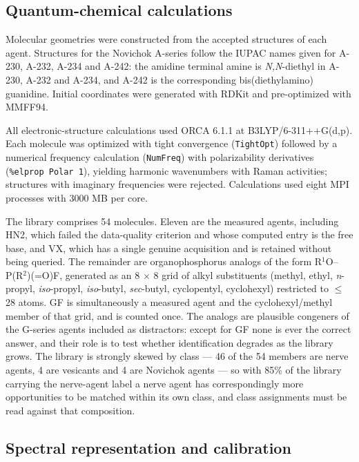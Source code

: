 \documentclass[review,12pt]{elsarticle}
\begin{document}
\subsection{Quantum-chemical calculations}

Molecular geometries were constructed from the accepted structures of each agent. Structures for the Novichok A-series follow the IUPAC names given for A-230, A-232, A-234 and A-242\cite{mirzayanov2008state,kloske2019novichoks,bhakhoa2019theoretical}: the amidine terminal amine is \textit{N,N}-diethyl in A-230, A-232 and A-234, and A-242 is the corresponding bis(diethylamino) guanidine. Initial coordinates were generated with RDKit\cite{rdkit} and pre-optimized with MMFF94.

All electronic-structure calculations used ORCA 6.1.1\cite{neese2020orca,neese2022software} at B3LYP/6-311++G(d,p).\cite{becke1993density,lee1988development,stephens1994abinitio} Each molecule was optimized with tight convergence (\texttt{TightOpt}) followed by a numerical frequency calculation (\texttt{NumFreq}) with polarizability derivatives (\texttt{\%elprop Polar 1}), yielding harmonic wavenumbers with Raman activities; structures with imaginary frequencies were rejected. Calculations used eight MPI processes with 3000 MB per core.

The library comprises 54 molecules. Eleven are the measured agents, including HN2, which failed the data-quality criterion and whose computed entry is the free base, and VX, which has a single genuine acquisition and is retained without being queried. The remainder are organophosphorus analogs of the form R$^{1}$O--P(R$^{2}$)(=O)F, generated as an 8 $\times$ 8 grid of alkyl substituents (methyl, ethyl, \textit{n}-propyl, \textit{iso}-propyl, \textit{iso}-butyl, \textit{sec}-butyl, cyclopentyl, cyclohexyl) restricted to $\leq$28 atoms. GF is simultaneously a measured agent and the cyclohexyl/methyl member of that grid, and is counted once. The analogs are plausible congeners of the G-series agents included as distractors: except for GF none is ever the correct answer, and their role is to test whether identification degrades as the library grows. The library is strongly skewed by class --- 46 of the 54 members are nerve agents, 4 are vesicants and 4 are Novichok agents --- so with 85\% of the library carrying the nerve-agent label a nerve agent has correspondingly more opportunities to be matched within its own class, and class assignments must be read against that composition.

\subsection{Spectral representation and calibration}
\end{document}
